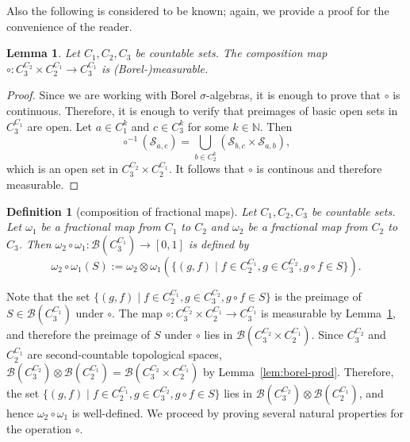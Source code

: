 \documentclass[nonacm]{acmart}
\newcommand{\N}{\mathbb N}
\newtheorem{definition}[theorem]{Definition}
\newtheorem{lemma}[theorem]{Lemma}
\begin{document}
Also the following is considered to be known; again, we provide a proof for the convenience of the reader. 
\begin{lemma}\label{lem:comp}
Let $C_1, C_2, C_3$ be countable sets. The composition map $\circ \colon C_3^{C_2} \times C_2^{C_1} \to C_3^{C_1}$ is (Borel-)measurable.
\end{lemma}

\begin{proof}
Since we are working with Borel $\sigma$-algebras, 
it is enough to prove that $\circ$ is continuous. 
Therefore, it is enough to verify that preimages of basic open sets in $C_3^{C_1}$ are open. Let $a\in C_1^k$ and $c \in C_3^k$ for some $k \in \N$. Then
\[\circ^{-1} (\mathscr{S}_{a,c}) = \bigcup_{b \in C_2^k} (\mathscr{S}_{b,c} \times \mathscr{S}_{a,b}),\]
which is an open set in $C_3^{C_2} \times C_2^{C_1}$.
It follows that $\circ$ is continous and therefore measurable.
\end{proof}

\begin{definition}[composition of fractional maps]
Let $C_1, C_2, C_3$ be countable sets. Let $\omega_1$ be a fractional map from $C_1$ to $C_2$ and $\omega_2$ be a fractional map from $C_2$ to $C_3$. Then $\omega_2 \circ \omega_1 \colon \mathcal{B}(C_3^{C_1}) \to [0,1]$ is defined by 
\[\omega_2\circ \omega_1 (S) := \omega_2 \otimes \omega_1 (\{(g, f) \mid f \in C_2^{C_1}, g \in C_3^{C_2}, g \circ f \in S\}).\]
\end{definition}

Note that the set $\{(g, f) \mid f \in C_2^{C_1}, g \in C_3^{C_2}, g \circ f \in S\}$ is the
preimage of $S \in \mathcal{B}(C_3^{C_1})$ under $\circ$. The map $\circ \colon C_3^{C_2} \times C_2^{C_1} \to C_3^{C_1}$ is measurable by Lemma~\ref{lem:comp}, and therefore the preimage of $S$ under $\circ$ lies in  ${\mathcal B}(C_3^{C_2} \times C_2^{C_1})$. Since $C_3^{C_2}$ and $C_2^{C_1}$ are second-countable topological spaces, ${\mathcal B}(C_3^{C_2}) \otimes {\mathcal B}(C_2^{C_1}) = {\mathcal B}(C_3^{C_2} \times C_2^{C_1})$ by Lemma~\ref{lem:borel-prod}. Therefore, the set $\{(g, f) \mid f \in C_2^{C_1}, g \in C_3^{C_2}, g \circ f \in S\}$ lies in $ {\mathcal B}(C_3^{C_2}) \otimes {\mathcal B}(C_2^{C_1})$, and hence $\omega_2 \circ \omega_1$ is well-defined.
We proceed by proving several natural properties for the operation $\circ$. 
\end{document}
